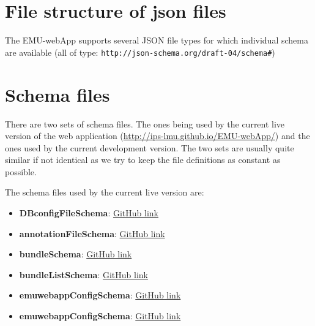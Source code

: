 \documentclass[A4,12pt, utf8]{article}
\begin{document}
\section{File structure of json files}

The EMU-webApp supports several JSON file types for which individual schema are available (all of type:
\texttt{http://json-schema.org/draft-04/schema\#})

\section{Schema files}

There are two sets of schema files. The ones being used by the current live version of the web application 
(\url{http://ips-lmu.github.io/EMU-webApp/}) and the ones used by the current development version.
The two sets are usually quite similar if not identical as we try to keep the file definitions as
constant as possible.

The schema files used by the current live version are:


\begin{itemize}
  \item \textbf{DBconfigFileSchema}: \href{https://github.com/IPS-LMU/EMU-webApp/blob/master/dist/schemaFiles/DBconfigFileSchema.json}{GitHub link}
  \item \textbf{annotationFileSchema}: \href{https://github.com/IPS-LMU/EMU-webApp/blob/master/dist/schemaFiles/annotationFileSchema.json}{GitHub link}
  \item \textbf{bundleSchema}: \href{https://github.com/IPS-LMU/EMU-webApp/blob/master/dist/schemaFiles/bundleSchema.json}{GitHub link}
  \item \textbf{bundleListSchema}: \href{https://github.com/IPS-LMU/EMU-webApp/blob/master/dist/schemaFiles/bundleListSchema.json}{GitHub link}
  \item \textbf{emuwebappConfigSchema}: \href{https://github.com/IPS-LMU/EMU-webApp/blob/master/dist/schemaFiles/emuwebappConfigSchema.json}{GitHub link}
  \item \textbf{emuwebappConfigSchema}: \href{https://github.com/IPS-LMU/EMU-webApp/blob/master/dist/schemaFiles/emuwebappConfigSchema.json}{GitHub link}
\end{itemize}
\end{document}
